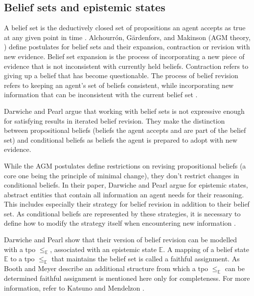 \documentclass[english, 12pt]{scrartcl}
\theoremstyle{definition}
\theoremstyle{definition}
\theoremstyle{definition}
\begin{document}
\subsection{Belief sets and epistemic states}
\label{chapter:belief-sets-and-epistemic-states}
A belief set is the deductively closed set of propositions an agent accepts as true at any given point in time \cite{Ferme2011}. Alchourrón, Gärdenfors, and Makinson (AGM theory, \cite{Alchourron1985}) define postulates for belief sets and their expansion, contraction or revision with new evidence. Belief set expansion is the process of incorporating a new piece of evidence that is not inconsistent with currently held beliefs. Contraction refers to giving up a belief that has become questionable. The process of belief revision refers to keeping an agent's set of beliefs consistent, while incorporating new information that can be inconsistent with the current belief set \cite{Katsuno1991, Gaerdenfors1984}.

Darwiche and Pearl \cite{Darwiche1997} argue that working with belief sets is not expressive enough for satisfying results in iterated belief revision. They make the distinction between propositional beliefs (beliefs the agent accepts and are part of the belief set) and conditional beliefs as beliefs the agent is prepared to adopt with new evidence.

While the AGM postulates define restrictions on revising propositional beliefs (a core one being the principle of minimal change), they don't restrict changes in conditional beliefs. In their paper, Darwiche and Pearl argue for epistemic states, abstract entities that contain all information an agent needs for their reasoning. This includes especially their strategy for belief revision in addition to their belief set. As conditional beliefs are represented by these strategies, it is necessary to define how to modify the strategy itself when encountering new information \cite{Darwiche1997}.

Darwiche and Pearl show that their version of belief revision can be modelled with a tpo $\leq_{\mathbb{E}}$, associated with an epistemic state $\mathbb{E}$. A mapping of a belief state $\mathbb{E}$ to a tpo $\leq_{\mathbb{E}}$ that maintains the belief set is called a faithful assignment. As Booth and Meyer describe an additional structure from which a tpo $\leq_{\mathbb{E}}$ can be determined faithful assignment is mentioned here only for completeness. For more information, refer to Katsuno and Mendelzon \cite{Katsuno1991}.
\end{document}

